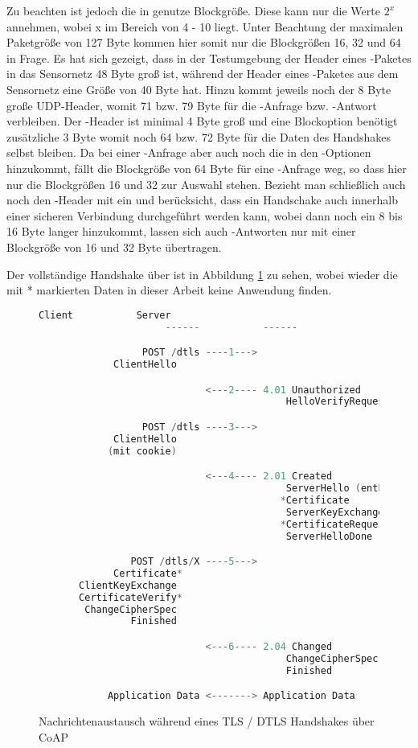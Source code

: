 Zu beachten ist jedoch die in  genutze Blockgröße. Diese kann nur die Werte $ 2^x $ annehmen, wobei x im Bereich von 4 - 10 liegt.
Unter Beachtung der maximalen Paketgröße von 127 Byte kommen hier somit nur die Blockgrößen 16, 32 und 64 in Frage. Es hat sich gezeigt,
dass in der Testumgebung der Header eines -Paketes in das Sensornetz 48 Byte groß ist, während der Header eines -Paketes
aus dem Sensornetz eine Größe von 40 Byte hat. Hinzu kommt jeweils noch der 8 Byte große UDP-Header, womit 71 bzw. 79 Byte für die -Anfrage bzw.
-Antwort verbleiben. Der -Header ist minimal 4 Byte groß und eine Blockoption benötigt zusätzliche 3 Byte womit noch 64 bzw. 72 Byte
für die Daten des Handshakes selbst bleiben. Da bei einer -Anfrage aber auch noch die  in den -Optionen hinzukommt,
fällt die Blockgröße von 64 Byte für eine -Anfrage weg, so dass hier nur die Blockgrößen 16 und 32 zur Auswahl stehen. Bezieht man schließlich
auch noch den -Header mit ein und berücksicht, dass ein Handschake auch innerhalb einer sicheren Verbindung durchgeführt werden kann, wobei
dann noch ein 8 bis 16 Byte langer  hinzukommt, lassen sich auch -Antworten nur mit einer Blockgröße von 16 und 32 Byte übertragen.

Der vollständige Handshake über  ist in Abbildung \ref{fig:coaphandshake} zu sehen, wobei wieder die mit * markierten Daten
in dieser Arbeit keine Anwendung finden.

\begin{figure}[ht]
  \centering
  \begin{lstlisting}[language=c]
                      Client           Server
                      ------           ------

                  POST /dtls ----1--->
             ClientHello

                             <---2---- 4.01 Unauthorized
                                           HelloVerifyRequest

                  POST /dtls ----3--->
             ClientHello
            (mit cookie)

                             <---4---- 2.01 Created
                                           ServerHello (enthält Session X)
                                          *Certificate
                                           ServerKeyExchange
                                          *CertificateRequest
                                           ServerHelloDone

                POST /dtls/X ----5--->
             Certificate*
       ClientKeyExchange
       CertificateVerify*
        ChangeCipherSpec
                Finished

                             <---6---- 2.04 Changed
                                           ChangeCipherSpec
                                           Finished

            Application Data <-------> Application Data
  \end{lstlisting}
  \caption{Nachrichtenaustausch während eines TLS / DTLS Handshakes über CoAP}
  \label{fig:coaphandshake}
\end{figure}

